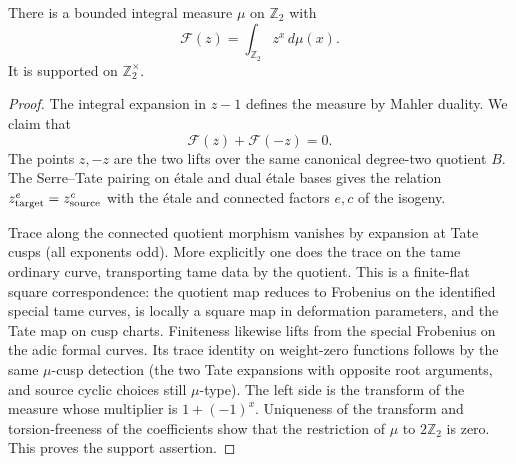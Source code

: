 \begin{lemma}
\label{split-measures:unit-support}
There is a bounded integral measure \(\mu\) on \(\mathbb Z_2\) with
\[
 \mathcal F(z)=\int_{\mathbb Z_2}z^x\,d\mu(x).
\]
It is supported on \(\mathbb Z_2^\times\).
\end{lemma}
\begin{proof}
The integral expansion in \(z-1\) defines the measure by Mahler duality.
We claim that
\[
 \mathcal F(z)+\mathcal F(-z)=0.
\]
The points \(z,-z\) are the two lifts over the same canonical degree-two quotient \(B\). The Serre--Tate pairing on étale and dual étale bases gives the relation \(z_{\rm target}^{e}=z_{\rm source}^c\) with the étale and connected factors \(e,c\) of the isogeny. 

Trace along the connected quotient morphism vanishes by expansion at Tate cusps (all exponents odd). More explicitly one does the trace on the tame ordinary curve, transporting tame data by the quotient. This is a finite-flat square correspondence: the quotient map reduces to Frobenius on the identified special tame curves, is locally a square map in deformation parameters, and the Tate map on cusp charts. Finiteness likewise lifts from the special Frobenius on the adic formal curves. Its trace identity on weight-zero functions follows by the same \(\mu\)-cusp detection (the two Tate expansions with opposite root arguments, and source cyclic choices still \(\mu\)-type). The left side is the transform of the measure whose multiplier is
\(1+(-1)^x\).  Uniqueness of the transform and torsion-freeness of the
coefficients show that the restriction of \(\mu\) to \(2\mathbb Z_2\)
is zero.  This proves the support assertion.
\end{proof}

